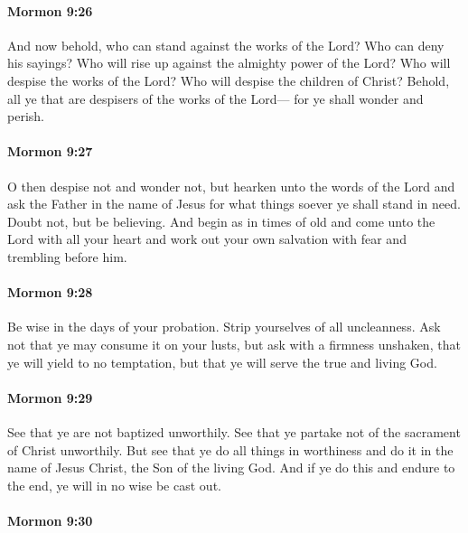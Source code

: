 		\paragraph{Mormon 9:26} %
			\label{MORMON-9-26}

			And now behold, who can stand against the works of the Lord?
			Who can deny his sayings?
			Who will rise up against the almighty power of the Lord?
			Who will despise the works of the Lord?
			Who will despise the children of Christ?
			Behold, all ye that are despisers of the works of the Lord---
			for ye shall wonder and perish.

		\paragraph{Mormon 9:27} %
			\label{MORMON-9-27}

			O then despise not and wonder not,
			but hearken unto the words of the Lord
			and ask the Father in the name of Jesus
			for what things soever ye shall stand in need.
			Doubt not, but be believing.
			And begin as in times of old
			and come unto the Lord with all your heart
			and work out your own salvation with fear and trembling before him.

		\paragraph{Mormon 9:28} %
			\label{MORMON-9-28}

			Be wise in the days of your probation.
			Strip yourselves of all uncleanness.
			Ask not that ye may consume it on your lusts,
			but ask with a firmness unshaken,
			that ye will yield to no temptation,
			but that ye will serve the true and living God.

		\paragraph{Mormon 9:29} %
			\label{MORMON-9-29}

			See that ye are not baptized unworthily.
			See that ye partake not of the sacrament of Christ unworthily.
			But see that ye do all things in worthiness
			and do it in the name of Jesus Christ, the Son of the living God.
			And if ye do this and endure to the end,
			ye will in no wise be cast out.

		\paragraph{Mormon 9:30} %
			\label{MORMON-9-30}

